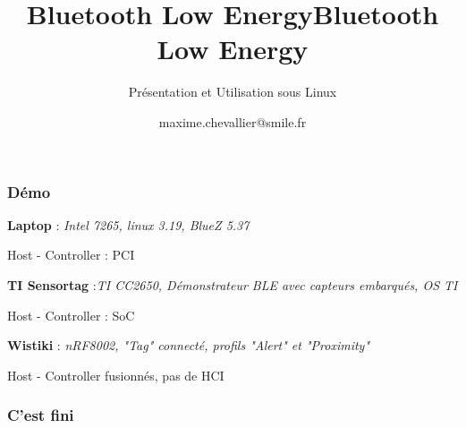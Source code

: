 \documentclass{smilebeamer}
\title{Bluetooth Low Energy}
\author{maxime.chevallier@smile.fr}
\begin{document}
\begin{frame}[plain]
    \title{Bluetooth Low Energy}
    \subtitle{Présentation et Utilisation sous Linux}
    \titlepage
\end{frame}







\begin{frame}
	\frametitle{Démo}

	\vspace{1cm}
	\textbf{Laptop} : {\small{\textit{Intel 7265, linux 3.19, BlueZ 5.37}}}
	
	{\small{Host - Controller : PCI}}

	\vspace{1cm}
	\textbf{TI Sensortag} :{\small{\textit{TI CC2650, Démonstrateur BLE avec capteurs embarqués, OS TI}}}
	
	{\small{Host - Controller : SoC}}

	\vspace{1cm}
	\textbf{Wistiki} : {\small{\textit{nRF8002, "Tag" connecté, profils "Alert" et "Proximity"}}}
	
	{\small{Host - Controller fusionnés, pas de HCI}}
\end{frame}

\begin{frame}
	\frametitle{C'est fini}
\end{frame}
\end{document}
